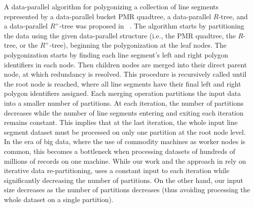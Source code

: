 A data-parallel algorithm for polygonizing a collection of line segments represented by a data-parallel bucket PMR quadtree, a data-parallel $R$-tree, and a data-parallel $R^+$-tree was proposed in ~\cite{HS03}. 
The algorithm starts by partitioning the data using the given data-parallel structure (i.e., the PMR quadtree, the $R$-tree, or the $R^+$-tree), beginning the polygonization at the leaf nodes. 
The polygonization starts by finding each line segment's left and right polygon identifiers in each node. Then children nodes are merged into their direct parent node, at which redundancy is resolved. This procedure is recursively called until the root node is reached, where all line segments have their final left and right polygon identifiers assigned. 
Each merging operation partitions the input data into a smaller number of partitions. At each iteration, the number of partitions decreases while the number of line segments entering and exiting each iteration remains constant.
This implies that at the last iteration, the whole input line segment dataset must be processed on only one partition at the root node level.
In the era of big data, where the use of commodity machines as worker nodes is common, this becomes a bottleneck when processing datasets of hundreds of millions of records on one machine.
While our work and the approach in \cite{HS03} rely on iterative data re-partitioning, \cite{HS03} uses a constant input to each iteration while significantly decreasing the number of partitions.
On the other hand, our input size decreases as the number of partitions decreases (thus avoiding processing the whole dataset on a single partition).

